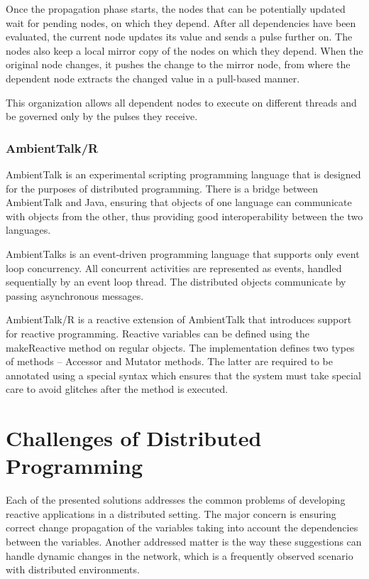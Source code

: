 \documentclass{sigplanconf}
\begin{document}
Once the propagation phase starts, the nodes that can be potentially updated wait for pending nodes, on which they depend. After all dependencies have been evaluated, the current node updates its value and sends a pulse further on. The nodes also keep a local mirror copy of the nodes on which they depend. When the original node changes, it pushes the change to the mirror node, from where the dependent node extracts the changed value in a pull-based manner.

This organization allows all dependent nodes to execute on different threads and be governed only by the pulses they receive.

\subsubsection{AmbientTalk/R}
AmbientTalk \cite{loosely} is an experimental scripting programming language that is designed for the purposes of distributed programming. There is a bridge between AmbientTalk and Java, ensuring that objects of one language can communicate with objects from the other, thus providing good interoperability between the two languages.

AmbientTalks is an event-driven programming language that supports only event loop concurrency. All concurrent activities are represented as events, handled sequentially by an event loop thread. The distributed objects communicate by passing asynchronous messages.

AmbientTalk/R is a reactive extension of AmbientTalk that introduces support for reactive programming. Reactive variables can be defined using the makeReactive method on regular objects. The implementation defines two types of methods – Accessor and Mutator methods. The latter are required to be annotated using a special syntax which ensures that the system must take special care to avoid glitches after the method is executed.

\section{Challenges of Distributed Programming}
Each of the presented solutions addresses the common problems of developing reactive applications in a distributed setting. The major concern is ensuring correct change propagation of the variables taking into account the dependencies between the variables. Another addressed matter is the way these suggestions can handle dynamic changes in the network, which is a frequently observed scenario with distributed environments.
\end{document}
